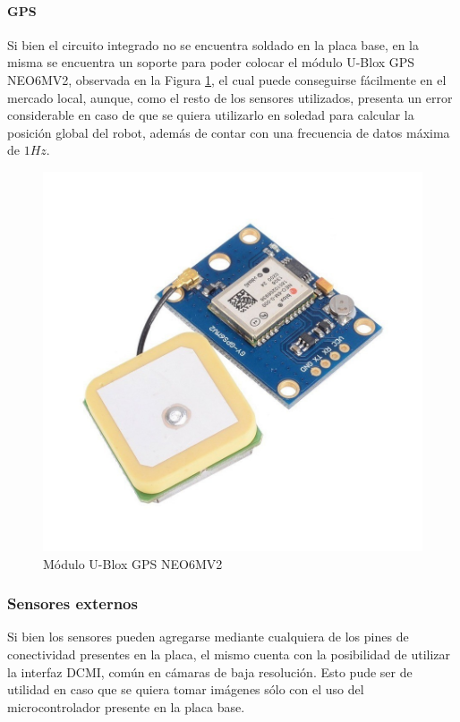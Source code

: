 \paragraph{GPS}
Si bien el circuito integrado no se encuentra soldado en la placa base, en la misma se encuentra un soporte para poder colocar el módulo U-Blox GPS NEO6MV2, observada en la Figura \ref{fig:gpsneo6mv2}, el cual puede conseguirse fácilmente en el mercado local, aunque, como el resto de los sensores utilizados, presenta un error considerable en caso de que se quiera utilizarlo en soledad para calcular la posición global del robot, además de contar con una frecuencia de datos máxima de $1Hz$.
\begin{figure}
    \centering
    \includegraphics[scale=0.2]{Img/GPSNEO6MV2.jpg}
    \caption{Módulo U-Blox GPS NEO6MV2}
    \label{fig:gpsneo6mv2}
\end{figure}

\subsubsection{Sensores externos}
Si bien los sensores pueden agregarse mediante cualquiera de los pines de conectividad presentes en la placa, el mismo cuenta con la posibilidad de utilizar la interfaz DCMI, común en cámaras de baja resolución. Esto pude ser de utilidad en caso que se quiera tomar imágenes sólo con el uso del microcontrolador presente en la placa base.

